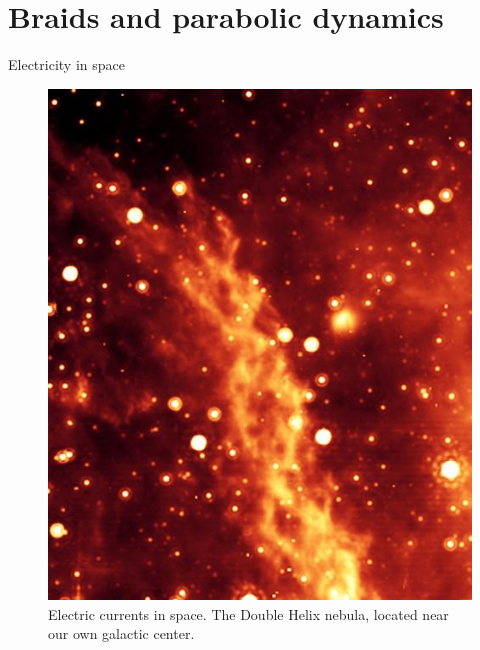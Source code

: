 \documentclass[9pt, english]{beamer}
\theoremstyle{definition}
\begin{document}

\section{Braids and parabolic dynamics}



\begin{frame}{Electricity in space}
\begin{figure}\label{fig:nebula}
        \includegraphics[height=0.7\textheight]{images/double-helix1-th.jpg}\caption{Electric currents in space. The Double Helix nebula, located near
        our own galactic center.}
        \end{figure}
\end{frame}
\end{document}
